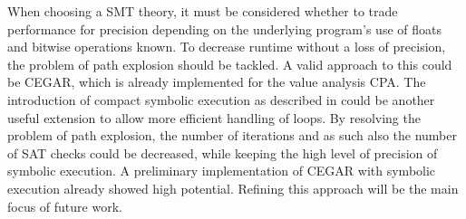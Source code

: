 When choosing a SMT theory,
it must be considered whether to trade performance for precision depending on the underlying program's use of floats and bitwise operations known.
To decrease runtime without a loss of precision, the problem of path explosion should be tackled.
A valid approach to this could be CEGAR, which is already implemented for the value analysis CPA.
The introduction of compact symbolic execution as described in \cite{Slaby2013} could be another useful extension to allow more efficient handling of loops.
By resolving the problem of path explosion, the number of iterations and as such also the number of SAT checks could be decreased, while keeping the high level of precision of symbolic execution.
A preliminary implementation of CEGAR with symbolic execution already showed high potential.
Refining this approach will be the main focus of future work.
